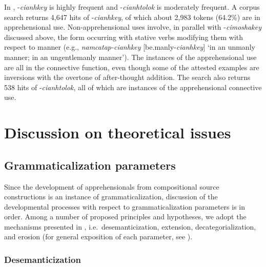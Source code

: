 \documentclass[output=paper,colorlinks,citecolor=brown]{langscibook}
\begin{document}
 In , \nobreakdash-\textit{cianhkey} is highly frequent and \nobreakdash-\textit{cianhtolok} is moderately frequent. A corpus search returns 4,647 hits of \nobreakdash-\textit{cianhkey}, of which about 2,983 tokens (64.2\%) are in apprehensional use. Non-apprehensional uses involve, in parallel with  \nobreakdash-\textit{cimoshakey} discussed above, the form occurring with stative verbs modifying them with respect to manner (e.g., \textit{namcatap-cianhkey} [be.manly-\textit{cianhkey}] `in an unmanly manner; in an ungentlemanly manner'). The instances of the apprehensional use are all in the connective function, even though some of the attested examples are inversions with the overtone of after-thought addition. The search also returns 538 hits of \nobreakdash-\textit{cianhtolok}, all of which are instances of the apprehensional connective use.





\section{Discussion on theoretical issues}
\label{sec:rhee:discussion}

\subsection{Grammaticalization parameters}
\label{subsec:parameters}

Since the development of apprehensionals from compositional source constructions is an instance of grammaticalization, discussion of the developmental processes with respect to grammaticalization parameters is in order. Among a number of proposed principles and hypotheses, we adopt the mechanisms presented in \citet[2]{HeineKuteva2002}, i.e.\  desemanticization, extension, decategorialization, and erosion (for general exposition of each parameter, see \citealt[35--44]{HeineKuteva2007}). 



\subsubsection{Desemanticization}
\label{subsubsec:desemanticization}
\end{document}
